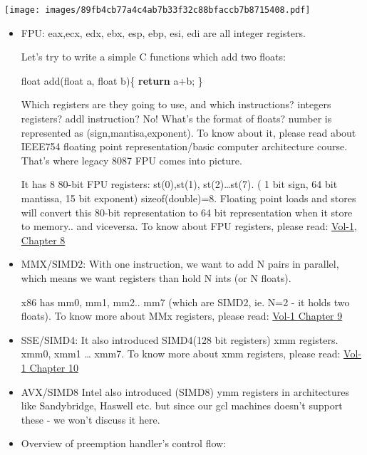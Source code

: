 \documentclass[]{book}
\newenvironment{Shaded}{}{}
\newcommand{\KeywordTok}[1]{\textbf{{#1}}}
\newcommand{\DataTypeTok}[1]{\textcolor[rgb]{0.50,0.00,0.00}{{#1}}}
\newcommand{\NormalTok}[1]{{#1}}
\begin{document}
\texttt{[image: images/89fb4cb77a4c4ab7b33f32c88bfaccb7b8715408.pdf]}

\begin{itemize}
\item
  FPU: eax,ecx, edx, ebx, esp, ebp, esi, edi are all integer registers.

  Let's try to write a simple C functions which add two floats:

\begin{Shaded}
\begin{Highlighting}[]
\DataTypeTok{float} \NormalTok{add(}\DataTypeTok{float} \NormalTok{a, }\DataTypeTok{float} \NormalTok{b)\{}
   \KeywordTok{return} \NormalTok{a+b;}
\NormalTok{\}}
\end{Highlighting}
\end{Shaded}

  Which registers are they going to use, and which instructions?
  integers registers? addl instruction? No! What's the format of floats?
  number is represented as (sign,mantisa,exponent). To know about it,
  please read about IEEE754 floating point representation/basic computer
  architecture course. That's where legacy 8087 FPU comes into picture.

  It has 8 80-bit FPU registers: st(0),st(1), st(2)\ldots{}st(7). ( 1
  bit sign, 64 bit mantissa, 15 bit exponent) sizeof(double)=8. Floating
  point loads and stores will convert this 80-bit representation to 64
  bit representation when it store to memory.. and viceversa. To know
  about FPU registers, please read:
  \href{http://www.cse.iitd.ac.in/~deepak/lab1/intel.pdf}{Vol-1, Chapter
  8}
\item
  MMX/SIMD2: With one instruction, we want to add N pairs in parallel,
  which means we want registers than hold N ints (or N floats).

  x86 has mm0, mm1, mm2.. mm7 (which are SIMD2, ie. N=2 - it holds two
  floats). To know more about MMx registers, please read:
  \href{http://www.cse.iitd.ac.in/~deepak/hohlabs/intel.pdf}{Vol-1
  Chapter 9}
\item
  SSE/SIMD4: It also introduced SIMD4(128 bit registers) xmm registers.
  xmm0, xmm1 \ldots{} xmm7. To know more about xmm registers, please
  read: \href{http://www.cse.iitd.ac.in/~deepak/hohlabs/intel.pdf}{Vol-1
  Chapter 10}
\item
  AVX/SIMD8 Intel also introduced (SIMD8) ymm registers in architectures
  like Sandybridge, Haswell etc. but since our gcl machines doesn't
  support these - we won't discuss it here.
\item
  Overview of preemption handler's control flow:
\end{itemize}
\end{document}
